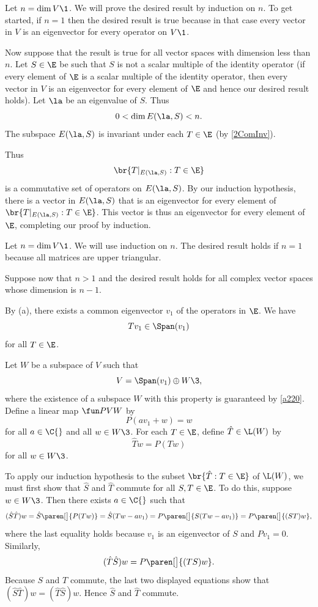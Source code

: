 \begin{Solution}
\begin{subtheorem}
\item
Let $n = \dim V\1$. We will prove the desired result by induction on $n$. To get started, if $n=1$ then the desired result is true because in that case every vector in $V$ is an eigenvector for every operator on $V\1$.

Now suppose that the result is true for all vector spaces with dimension less than $n$. Let $S \in \E$ be such that $S$ is not a scalar multiple of the identity operator (if every element of $\E$ is a scalar multiple of the identity operator, then every vector in $V$ is an eigenvector for every element of $\E$ and hence our desired result holds). Let $\la$ be an eigenvalue of $S$. Thus
\[
0 < \dim E(\la, S) < n.
\]
The subspace $E(\la, S)$ is invariant under each $T \in \E$ (by \ref{2ComInv}).

Thus
\[
\br{ T|_{E(\la, S)}: T \in \E}
\]
is a commutative set of operators on $E(\la, S)$. By our induction hypothesis, there is a vector in
$E(\la, S)$ that is an eigenvector for every element of $\br{ T|_{E(\la, S)}: T \in \E}$. This vector is thus an eigenvector for every element of $\E$, completing our proof by induction.

\item
Let $n = \dim V\1$. We will use induction on $n$. The desired result holds if $n = 1$ because all  matrices are upper triangular.

Suppose now that $n > 1$ and the desired result holds for all complex vector spaces whose dimension is $n-1$.

By (a), there exists a common eigenvector $v_1$ of the operators in $\E$. We have
\[
Tv_1 \in \Span(v_1)
\]
for all $T \in \E$.

Let $W$ be a subspace of $V$ such that
\[
V = \Span(v_1) \oplus W\3,
\]
where the existence of a subspace $W$ with this property is guaranteed by \ref{a220}. Define a linear map $\fun P V W$ by
\[
P(a v_1 + w) = w
\]
for all $a \in \C{}$ and all $w \in W\3$. For each $T\in \E$, define $\hat T \in \L(W)$ by
\[
\hat T w = P(Tw)
\]
for all $w \in W\3$.

To apply our induction hypothesis to the subset $\br{ \hat T : T \in \E}$ of $\L(W)$, we must first show that $\hat S$ and $\hat T$ commute for all $S, T \in \E$. To do this, suppose $w \in W\3$. Then there exists $a \in \C{}$ such that
\[
(\hat S \hat T)w = \hat S \paren[\big]{ P(Tw) } = \hat S (Tw - av_1) = P \paren[\big]{ S(Tw - a v_1) }
= P \paren[\big]{ (ST) w },
\]
where the last equality holds because $v_1$ is an eigenvector of $S$ and $Pv_1 = 0$. Similarly,
\[
(\hat T \hat S)w = P \paren[\big]{ (TS) w }.
\]
Because $S$ and $T$ commute, the last two displayed equations show that $(\hat S \hat T)w = (\hat T \hat S)w$. Hence $\hat S$ and $\hat T$ commute.


\end{subtheorem}
\end{Solution}
